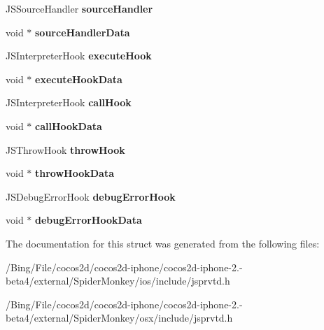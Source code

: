 \begin{DoxyCompactItemize}
\item 
\hypertarget{struct_j_s_debug_hooks_a5c4c07ea74a6d6b6781c506601c5d15c}{J\-S\-Source\-Handler {\bfseries source\-Handler}}\label{struct_j_s_debug_hooks_a5c4c07ea74a6d6b6781c506601c5d15c}

\item 
\hypertarget{struct_j_s_debug_hooks_a3ad5cbf2dc8151adf16ad8caf2532f8b}{void $\ast$ {\bfseries source\-Handler\-Data}}\label{struct_j_s_debug_hooks_a3ad5cbf2dc8151adf16ad8caf2532f8b}

\item 
\hypertarget{struct_j_s_debug_hooks_a17647bb715a98c01d90f5584ec4da4d0}{J\-S\-Interpreter\-Hook {\bfseries execute\-Hook}}\label{struct_j_s_debug_hooks_a17647bb715a98c01d90f5584ec4da4d0}

\item 
\hypertarget{struct_j_s_debug_hooks_a768ce60c4f3feece907f97ea59d795a3}{void $\ast$ {\bfseries execute\-Hook\-Data}}\label{struct_j_s_debug_hooks_a768ce60c4f3feece907f97ea59d795a3}

\item 
\hypertarget{struct_j_s_debug_hooks_a0d0f34686222cdb110e311319af83418}{J\-S\-Interpreter\-Hook {\bfseries call\-Hook}}\label{struct_j_s_debug_hooks_a0d0f34686222cdb110e311319af83418}

\item 
\hypertarget{struct_j_s_debug_hooks_a0540c4c9447ea02babbb84160d8d7b44}{void $\ast$ {\bfseries call\-Hook\-Data}}\label{struct_j_s_debug_hooks_a0540c4c9447ea02babbb84160d8d7b44}

\item 
\hypertarget{struct_j_s_debug_hooks_aaa364bb846d9d403ea9ad525f657da85}{J\-S\-Throw\-Hook {\bfseries throw\-Hook}}\label{struct_j_s_debug_hooks_aaa364bb846d9d403ea9ad525f657da85}

\item 
\hypertarget{struct_j_s_debug_hooks_a46877baa9daa3fba9d93e488711353a7}{void $\ast$ {\bfseries throw\-Hook\-Data}}\label{struct_j_s_debug_hooks_a46877baa9daa3fba9d93e488711353a7}

\item 
\hypertarget{struct_j_s_debug_hooks_a699bde84091c404da1659a6f3af4a1b3}{J\-S\-Debug\-Error\-Hook {\bfseries debug\-Error\-Hook}}\label{struct_j_s_debug_hooks_a699bde84091c404da1659a6f3af4a1b3}

\item 
\hypertarget{struct_j_s_debug_hooks_a241e208631ac0dae86b7dc8150aca016}{void $\ast$ {\bfseries debug\-Error\-Hook\-Data}}\label{struct_j_s_debug_hooks_a241e208631ac0dae86b7dc8150aca016}

\end{DoxyCompactItemize}


The documentation for this struct was generated from the following files\-:\begin{DoxyCompactItemize}
\item 
/\-Bing/\-File/cocos2d/cocos2d-\/iphone/cocos2d-\/iphone-\/2.-\/beta4/external/\-Spider\-Monkey/ios/include/jsprvtd.\-h\item 
/\-Bing/\-File/cocos2d/cocos2d-\/iphone/cocos2d-\/iphone-\/2.-\/beta4/external/\-Spider\-Monkey/osx/include/jsprvtd.\-h\end{DoxyCompactItemize}
